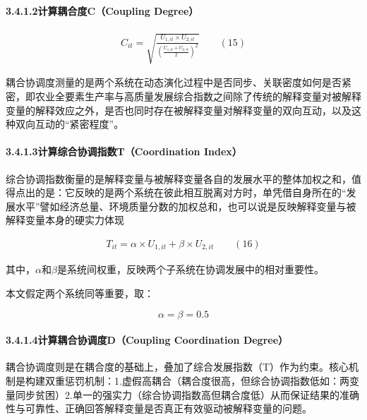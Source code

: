 \documentclass[UTF8,a4paper,12pt,fontset=windows]{ctexart}
\begin{document}
\paragraph{3.4.1.2计算耦合度C（Coupling Degree）}\label{ux8ba1ux7b97ux8026ux5408ux5ea6ccoupling-degree}

\[\begin{array}{r}
C_{it} = \sqrt{\frac{U_{1,it} \times U_{2,it}}{\left( \frac{U_{1,it} + U_{2,it}}{2} \right)^{2}}}\qquad(15)
\end{array}\]

耦合协调度测量的是两个系统在动态演化过程中是否同步、关联密度如何是否紧密，即农业全要素生产率与高质量发展综合指数之间除了传统的解释变量对被解释变量的解释效应之外，是否也同时存在被解释变量对解释变量的双向互动，以及这种双向互动的``紧密程度''。

\paragraph{3.4.1.3计算综合协调指数T（Coordination Index）}\label{ux8ba1ux7b97ux7efcux5408ux534fux8c03ux6307ux6570tcoordination-index}

综合协调指数衡量的是解释变量与被解释变量各自的发展水平的整体加权之和，值得点出的是：它反映的是两个系统在彼此相互脱离对方时，单凭借自身所在的``发展水平''譬如经济总量、环境质量分数的加权总和，也可以说是反映解释变量与被解释变量本身的硬实力体现

\[\begin{array}{r}
T_{it} = \alpha \times U_{1,it} + \beta \times U_{2,it}\qquad(16)
\end{array}\]

其中，\(\alpha\)和\(\beta\)是系统间权重，反映两个子系统在协调发展中的相对重要性。

本文假定两个系统同等重要，取：

\[\alpha = \beta = 0.5\]

\paragraph{3.4.1.4计算耦合协调度D（Coupling Coordination Degree）}\label{ux8ba1ux7b97ux8026ux5408ux534fux8c03ux5ea6dcoupling-coordination-degree}

耦合协调度则是在耦合度的基础上，叠加了综合发展指数（T）作为约束。核心机制是构建双重惩罚机制：1.虚假高耦合（耦合度很高，但综合协调指数低如：两变量同步贫困）2.单一的强实力（综合协调指数高但耦合度低）从而保证结果的准确性与可靠性、正确回答解释变量是否真正有效驱动被解释变量的问题。
\end{document}
